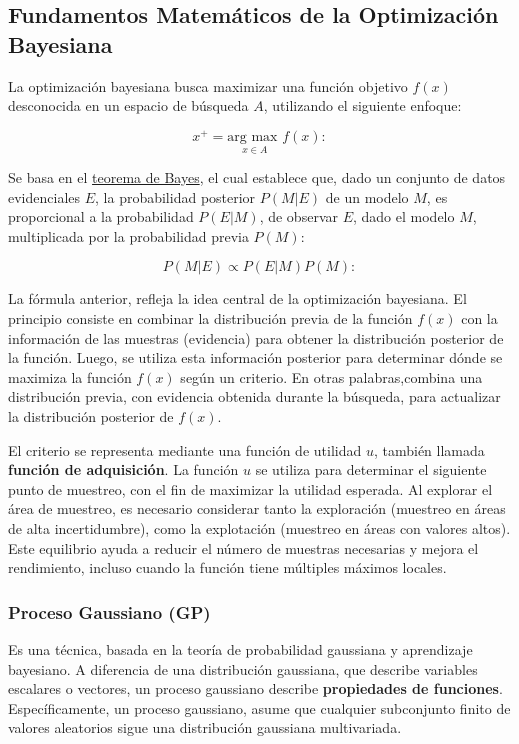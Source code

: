 \documentclass[
  12pt,
  letterpaper,
  DIV=11,
  numbers=noendperiod]{scrartcl}
\begin{document}
\subsection{Fundamentos Matemáticos de la Optimización
Bayesiana}\label{fundamentos-matemuxe1ticos-de-la-optimizaciuxf3n-bayesiana}

La optimización bayesiana busca maximizar una función objetivo \(f(x)\)
desconocida en un espacio de búsqueda \(A\), utilizando el siguiente
enfoque:

\[
x^+ = \underset{x \in A}{\text{arg max }} f(x) : \tag{1}
\]

Se basa en el \href{https://arxiv.org/pdf/1012.2599.pdf}{teorema de
Bayes}, el cual establece que, dado un conjunto de datos evidenciales
\(E\), la probabilidad posterior \(P(M|E)\) de un modelo \(M\), es
proporcional a la probabilidad \(P(E|M)\), de observar \(E\), dado el
modelo \(M\), multiplicada por la probabilidad previa \(P(M)\):

\[
P(M|E) \propto P(E|M)P(M) : \tag{2}
\]

La fórmula anterior, refleja la idea central de la optimización
bayesiana. El principio consiste en combinar la distribución previa de
la función \(f(x)\) con la información de las muestras (evidencia) para
obtener la distribución posterior de la función. Luego, se utiliza esta
información posterior para determinar dónde se maximiza la función
\(f(x)\) según un criterio. En otras palabras,combina una distribución
previa, con evidencia obtenida durante la búsqueda, para actualizar la
distribución posterior de \(f(x)\).

El criterio se representa mediante una función de utilidad \(u\),
también llamada \textbf{función de adquisición}. La función \(u\) se
utiliza para determinar el siguiente punto de muestreo, con el fin de
maximizar la utilidad esperada. Al explorar el área de muestreo, es
necesario considerar tanto la exploración (muestreo en áreas de alta
incertidumbre), como la explotación (muestreo en áreas con valores
altos). Este equilibrio ayuda a reducir el número de muestras necesarias
y mejora el rendimiento, incluso cuando la función tiene múltiples
máximos locales.

\subsubsection{Proceso Gaussiano (GP)}\label{proceso-gaussiano-gp}

Es una técnica, basada en la teoría de probabilidad gaussiana y
aprendizaje bayesiano. A diferencia de una distribución gaussiana, que
describe variables escalares o vectores, un proceso gaussiano describe
\textbf{propiedades de funciones}. Específicamente, un proceso
gaussiano, asume que cualquier subconjunto finito de valores aleatorios
sigue una distribución gaussiana multivariada.
\end{document}
